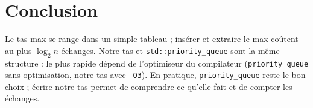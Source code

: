 \documentclass[11pt,a4paper]{article}
\begin{document}
\section{Conclusion}

Le tas max se range dans un simple tableau ; insérer et extraire le max coûtent au plus
$\log_2 n$ échanges. Notre tas et \texttt{std::priority\_queue} sont la même structure : le
plus rapide dépend de l'optimiseur du compilateur (\texttt{priority\_queue} sans
optimisation, notre tas avec \texttt{-O3}). En pratique, \texttt{priority\_queue} reste le bon
choix ; écrire notre tas permet de comprendre ce qu'elle fait et de compter les échanges.
\end{document}
